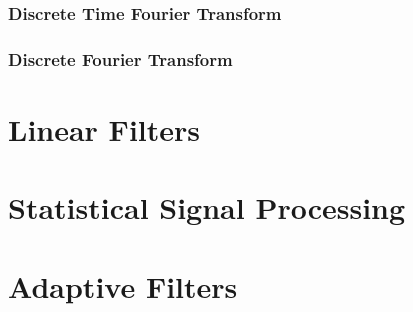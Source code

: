 \subsubsection{Discrete Time Fourier Transform}

\subsubsection{Discrete Fourier Transform}


\section{Linear Filters}


\section{Statistical Signal Processing}



\section{Adaptive Filters}
